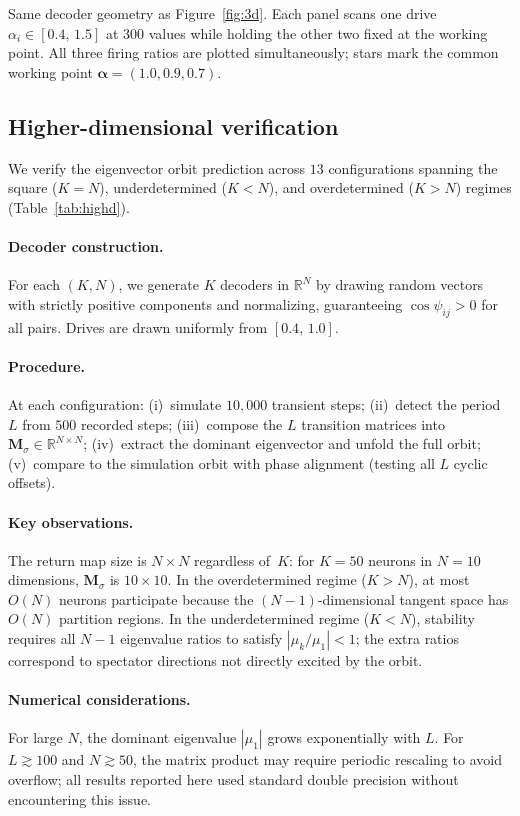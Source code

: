 \documentclass[12pt]{article}
\newcommand{\vv}[1]{\mathbf{#1}}
\newcommand{\RR}{\mathbb{R}}
\begin{document}
Same decoder geometry as Figure~\ref{fig:3d}.  Each panel scans one
drive $\alpha_i\in[0.4,\,1.5]$ at $300$ values while holding the other
two fixed at the working point.  All three firing ratios are plotted
simultaneously; stars mark the common working point
$\boldsymbol{\alpha}=(1.0,0.9,0.7)$.

\subsection{Higher-dimensional verification}\label{app:highd}

We verify the eigenvector orbit prediction across $13$ configurations
spanning the square ($K{=}N$), underdetermined ($K{<}N$), and
overdetermined ($K{>}N$) regimes (Table~\ref{tab:highd}).

\paragraph{Decoder construction.}
For each $(K,N)$, we generate $K$ decoders in $\RR^N$ by drawing
random vectors with strictly positive components and normalizing,
guaranteeing $\cos\psi_{ij}>0$ for all pairs.  Drives are drawn
uniformly from $[0.4,\,1.0]$.

\paragraph{Procedure.}
At each configuration: (i)~simulate $10{,}000$ transient steps;
(ii)~detect the period~$L$ from $500$ recorded steps;
(iii)~compose the $L$ transition matrices into
$\vv{M}_\sigma\in\RR^{N\times N}$;
(iv)~extract the dominant eigenvector and unfold the full orbit;
(v)~compare to the simulation orbit with phase alignment (testing all
$L$ cyclic offsets).

\paragraph{Key observations.}
The return map size is $N{\times}N$ regardless of~$K$: for $K=50$
neurons in $N=10$ dimensions, $\vv{M}_\sigma$ is $10{\times}10$.
In the overdetermined regime ($K>N$), at most $O(N)$ neurons
participate because the $(N{-}1)$-dimensional tangent space has
$O(N)$ partition regions.  In the underdetermined regime ($K<N$),
stability requires all $N{-}1$ eigenvalue ratios to satisfy
$|\mu_k/\mu_1|<1$; the extra ratios correspond to spectator
directions not directly excited by the orbit.

\paragraph{Numerical considerations.}
For large $N$, the dominant eigenvalue $|\mu_1|$ grows exponentially
with $L$.  For $L\gtrsim 100$ and $N\gtrsim 50$, the matrix product
may require periodic rescaling to avoid overflow; all results reported
here used standard double precision without encountering this issue.
\end{document}
